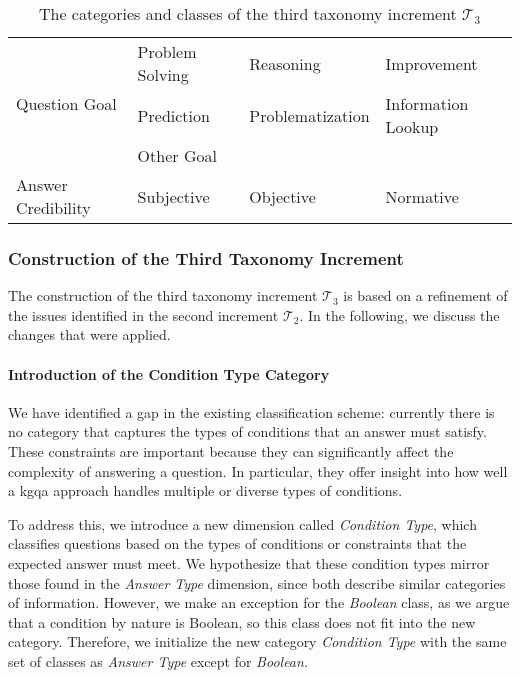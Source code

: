 \begin{table}[t]
\begin{tabular}{|l|lll|}
\multirow{3}{*}{Question Goal} & \multicolumn{1}{l|}{Problem Solving} & \multicolumn{1}{l|}{Reasoning} & Improvement \\ \cline{2-4} 
 & \multicolumn{1}{l|}{Prediction} & \multicolumn{1}{l|}{Problematization} & \multicolumn{1}{l|}{Information Lookup} \\ \cline{2-4} 
 & \multicolumn{3}{l|}{Other Goal} \\
 \hline
 
Answer Credibility & \multicolumn{1}{l|}{Subjective} & \multicolumn{1}{l|}{Objective} & \multicolumn{1}{l|}{Normative}  \\ 
 \hline
\end{tabular}%
\caption[Categories and Classes of the Third Taxonomy Increment]{The categories and classes of the third taxonomy increment $\mathcal{T}_3$}
\label{tab:taxonomy_t3}
\end{table}

\subsubsection{Construction of the Third Taxonomy Increment}

The construction of the third taxonomy increment $\mathcal{T}_3$ is based on a refinement of the issues identified in the second increment $\mathcal{T}_2$. In the following, we discuss the changes that were applied.

\paragraph{Introduction of the Condition Type Category}
We have identified a gap in the existing classification scheme: currently there is no category that captures the types of conditions that an answer must satisfy. These constraints are important because they can significantly affect the complexity of answering a question. In particular, they offer insight into how well a \gls{kgqa} approach handles multiple or diverse types of conditions.

To address this, we introduce a new dimension called \emph{Condition Type}, which classifies questions based on the types of conditions or constraints that the expected answer must meet. We hypothesize that these condition types mirror those found in the \emph{Answer Type} dimension, since both describe similar categories of information. However, we make an exception for the \emph{Boolean} class, as we argue that a condition by nature is Boolean, so this class does not fit into the new category. Therefore, we initialize the new category \emph{Condition Type} with the same set of classes as \emph{Answer Type} except for \emph{Boolean}.

